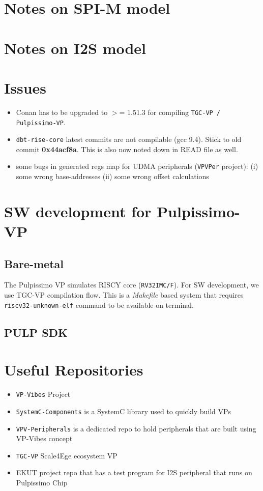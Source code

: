 \documentclass{article}
\begin{document}
\section{Notes on SPI-M model}

\section{Notes on I2S model}

\section{Issues}
\begin{itemize}
 \item Conan has to be upgraded to $>$= 1.51.3 for compiling \texttt{TGC-VP / Pulpissimo-VP}.
 \item \texttt{dbt-rise-core} latest commits are not compilable (gcc 9.4). Stick to old commit \textbf{0x44acf8a}.
       This is also now noted down in READ file as well.
 \item some bugs in generated regs map for UDMA peripherals (\texttt{VPVPer} project):
       (i) some wrong base-addresses (ii) some wrong offset calculations
\end{itemize}

\section{SW development for Pulpissimo-VP}
\subsection{Bare-metal}
The Pulpissimo VP simulates RISCY core (\texttt{RV32IMC/F}). For SW development, we use
TGC-VP compilation flow. This is a \textit{Makefile} based system that requires \texttt{riscv32-unknown-elf}
command to be available on terminal.

\subsection{PULP SDK}

\newpage
\section{Useful Repositories}
\begin{itemize}
 \item \texttt{VP-Vibes} Project
 \item \texttt{SystemC-Components} is a SystemC library used to quickly build VPs
 \item \texttt{VPV-Peripherals} is a dedicated repo to hold peripherals that are built using VP-Vibes concept
 \item \texttt{TGC-VP} Scale4Ege ecosystem VP
 \item EKUT project repo that has a test program for I2S peripheral that runs on Pulpissimo Chip
\end{itemize}
\end{document}
